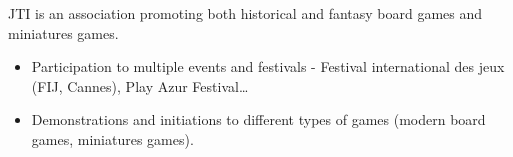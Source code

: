 \documentclass[10pt, a4paper, ragged2e]{altacv}
\begin{document}

		JTI is an association promoting both historical and fantasy board games and miniatures games.

		\medskip
		\begin{itemize}
			\item Participation to multiple events and festivals - Festival international des jeux (FIJ, Cannes), Play Azur Festival\ldots
			\item Demonstrations and initiations to different types of games (modern board games, miniatures games).
		\end{itemize}
\end{document}
